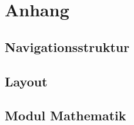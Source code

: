 \setcounter{section}{0}
\setcounter{subsection}{0}
\renewcommand*\thesection{\Alph{section}}

\chapter{Anhang}
\section{Navigationsstruktur}



\section{Layout}




\section{Modul Mathematik}

